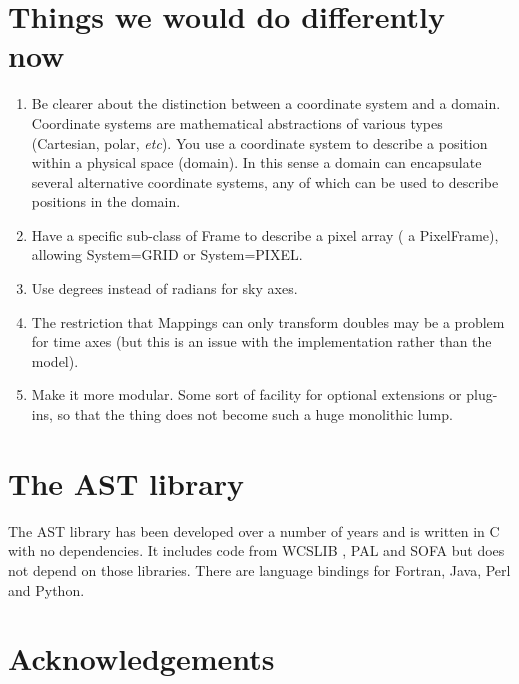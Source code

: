 \documentclass[final,authoryear,5p,times,twocolumn]{elsarticle}
\begin{document}
\section{Things we would do differently now}

\begin{enumerate}

\item Be clearer about the distinction between a coordinate system and
  a domain. Coordinate systems are mathematical abstractions of
  various types (Cartesian, polar, \emph{etc}). You use a coordinate system
  to describe a position within a physical space (domain). In this
  sense a domain can encapsulate several alternative coordinate
  systems, any of which can be used to describe positions in the
  domain.

\item Have a specific sub-class of Frame to describe a pixel array ( a
  PixelFrame), allowing System=GRID or System=PIXEL.

\item Use degrees instead of radians for sky axes.

\item The restriction that Mappings can only transform doubles may be
  a problem for time axes (but this is an issue with the
  implementation rather than the model).

\item Make it more modular. Some sort of facility for optional
  extensions or plug-ins, so that the thing does not become such a
  huge monolithic lump.

\end{enumerate}

\section{The AST library}

The AST library has been developed over a number of years
\citep{1998ASPC..145...41W,2000ASPC..216..506W,2001ASPC..238..129B,2004ASPC..314..412B,2008ASPC..394..635B,2010ASPC..434..213B,2012ASPC..461..825B}
  and is written in C with no dependencies. It includes code from
  WCSLIB \citep[][]{2006ASPC..351..591C}, PAL \citep{2013ASPC..475..307J}
  and SOFA \citep[][]{2011SchpJ...611404H} but does not depend on those
  libraries. There are language bindings for Fortran, Java, Perl and
  Python.

\section{Acknowledgements}
\end{document}
